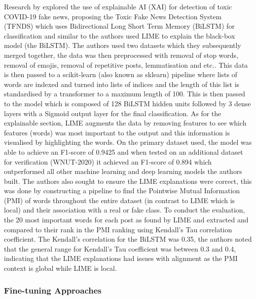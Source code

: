 \documentclass[stu,12pt,floatsintext,donotrepeattitle]{apa7}
\begin{document}
Research by \textcite{xai-bilstm} explored the use of explainable AI (XAI) for detection of toxic COVID-19 fake news, proposing the Toxic Fake News Detection System (TFNDS) which uses Bidirectional Long Short Term Memory (BiLSTM) for classification and similar to \textcite{Xflag} the authors used LIME to explain the black-box model (the BiLSTM). The authors used two datasets which they subsequently merged together, the data was then preprocessed with removal of stop words, removal of emojis, removal of repetitive posts, lemmatisation and etc.. This data is then passed to a scikit-learn (also known as sklearn) pipeline where lists of words are indexed and turned into lists of indices and the length of this list is standardised by a transformer to a maximum length of 100. This is then passed to the model which is composed of 128 BiLSTM hidden units followed by 3 dense layers with a Sigmoid output layer for the final classification. As for the explainable section, LIME augments the data by removing features to see which features (words) was most important to the output and this information is visualised by highlighting the words. On the primary dataset used, the model was able to achieve an F1-score of 0.9425 and when tested on an additional dataset for verification (WNUT-2020) it achieved an F1-score of 0.894 which outperformed all other machine learning and deep learning models the authors built. The authors also sought to ensure the LIME explanations were correct, this was done by constructing a pipeline to find the Pointwise Mutual Information (PMI) of words throughout the entire dataset (in contrast to LIME which is local) and their association with a real or fake class. To conduct the evaluation, the 20 most important words for each post as found by LIME and extracted and compared to their rank in the PMI ranking using Kendall's Tau correlation coefficient. The Kendall's correlation for the BiLSTM was 0.35, the authors noted that the general range for Kendall's Tau coefficient was between 0.3 and 0.4, indicating that the LIME explanations had issues with alignment as the PMI context is global while LIME is local. 


\subsubsection{Fine-tuning Approaches}
\end{document}
